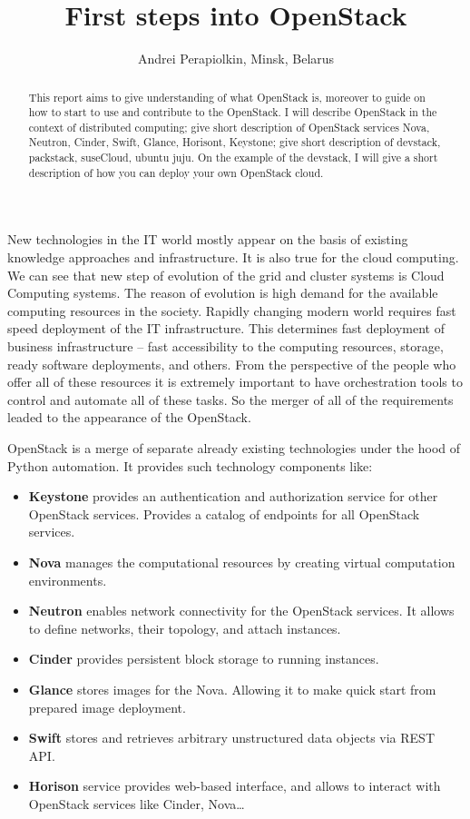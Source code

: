 \documentclass[10pt, a5paper]{article}
\begin{document}
\title{First steps into OpenStack}
\author{Andrei Perapiolkin, Minsk, Belarus}
\maketitle
\begin{abstract}
This report aims to give understanding of what OpenStack is, moreover to guide on how to start to use and contribute to the OpenStack. I will describe OpenStack in the context of distributed computing; give short description of OpenStack services Nova, Neutron, Cinder, Swift, Glance, Horisont, Keystone; give short description of devstack, packstack, suseCloud, ubuntu juju. On the example of the devstack, I will give a short description of how you can deploy your own OpenStack cloud.
\end{abstract}


New technologies in the IT world mostly appear on the basis of existing knowledge approaches and infrastructure. It is also true for the cloud computing. We can see that new step of evolution of the grid and cluster systems is Cloud Computing systems. The reason of evolution is high demand for the available computing resources in the society. Rapidly changing modern world requires fast speed deployment of the IT infrastructure. This determines fast deployment of business infrastructure -- fast accessibility to the computing resources, storage, ready software deployments, and others. From the perspective of the people who offer all of these resources it is extremely important to have orchestration tools to control and automate all of these tasks. So the merger of all of the requirements leaded to the appearance of the OpenStack.

OpenStack is a merge of separate already existing technologies under the hood of Python automation. It provides such technology components like:

\begin{itemize}
  \item \textbf{Keystone} provides an authentication and authorization service for other OpenStack services. Provides a catalog of endpoints for all OpenStack services.
  \item \textbf{Nova} manages the computational resources by creating virtual computation environments.
  \item \textbf{Neutron} enables network connectivity for the OpenStack services. It allows to define networks, their topology, and attach instances.
  \item \textbf{Cinder} provides persistent block storage to running instances.
  \item \textbf{Glance} stores images for the Nova. Allowing it to make quick start from prepared image deployment.
  \item \textbf{Swift} stores and retrieves arbitrary unstructured data objects via REST API.
  \item \textbf{Horison} service provides web-based interface, and allows to \linebreak interact with OpenStack services like Cinder, Nova…
\end{itemize}
\end{document}
